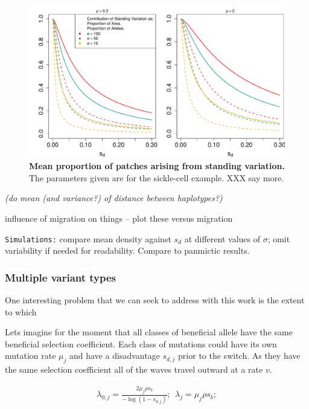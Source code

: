 \documentclass{article}
\newcommand{\marginnote}[1]{{\it\color{red}(#1)}}
\begin{document}
\begin{figure}[ht]
\begin{center}
  \includegraphics[width=1.0\textwidth]{G6PD_standing_var_proportion}
\caption{ %
{\bf Mean proportion of patches arising from standing variation.} The parameters given are for the sickle-cell example.  XXX say more.
} \label{G6PD_standing_var_proportion}
\end{center}
\end{figure}


\marginnote{do mean (and variance?) of distance between haplotypes?}

influence of migration on things -- plot these versus migration 

{\tt Simulations:} compare mean density against $s_d$ at different values of $\sigma$; omit variability if needed for readability.
Compare to panmictic results.


\subsubsection{Multiple variant types}

One interesting problem that we can seek to address with this work is
the extent to which 

Lets imagine for the moment that all classes of beneficial allele have
the same beneficial selection coefficient. 
Each class of mutations could have its own mutation rate $\mu_j$ and
have a disadvantage $s_{d,j}$ prior to the switch. As they have the
same selection coefficient all of the waves travel outward at a rate
$v$. 

\begin{align}
    \lambda_{0,j} = \frac{ 2 \mu_j \rho s_b }{ -\log(1-s_{d,j}) } ; ~~      \lambda_{j} = \mu_j \rho s_b;
\end{align}
\end{document}
